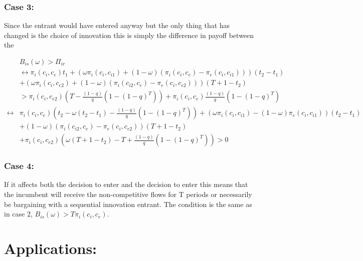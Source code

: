 \documentclass[11pt]{article}
\begin{document}
\subsubsection{Case 3:}

Since the entrant would have entered anyway but the only thing that has changed is the choice of innovation this is simply the difference in payoff between the 

\begin{align*}
&B_{is}(\omega)>\Pi_{ir}
\\
& \leftrightarrow \pi_i(c_i,c_{e})t_1 
+(\omega \pi_i(c_i,c_{i1})+(1-\omega)(\pi_i(c_i,c_{e})-\pi_e(c_i,c_{i1})))(t_2-t_1)
\\&+(\omega \pi_i(c_i,c_{e2})+(1-\omega)(\pi_i(c_{i2},c_e)-\pi_e(c_{i},c_{e2})))(T+1-t_2)  \\
&> \pi_{i}(c_i,c_{e2}) \left( T - \frac{(1-q)}{q} \left( 1-(1-q)^T \right) \right)
+\pi_i(c_i,c_e) \frac{(1-q)}{q} \left( 1-(1-q)^T \right) \\
\leftrightarrow &\pi_i(c_i,c_e)(t_2 -\omega(t_2-t_1)-\frac{(1-q)}{q} \left( 1-(1-q)^T \right)) 
+(\omega \pi_i(c_i,c_{i1})-(1-\omega)\pi_e(c_i,c_{i1}))(t_2-t_1) \\
& +(1-\omega)(\pi_i(c_{i2},c_e)-\pi_e(c_{i},c_{e2}))(T+1-t_2) \\
&+ \pi_i(c_{i},c_{e2})\left(\omega(T+1-t_2)-T+\frac{(1-q)}{q} \left( 1-(1-q)^T \right)\right)
> 0
\end{align*}

\subsubsection{Case 4:}

If it affects both the decision to enter and the decision to enter this means that the incumbent will receive the non-competitive flows for T periods or necessarily be bargaining with a sequential innovation entrant. The condition is the same as in case 2, $ B_{is}(\omega)>T \pi_i(c_i,c_e)$.

\section{Applications:}
\end{document}

